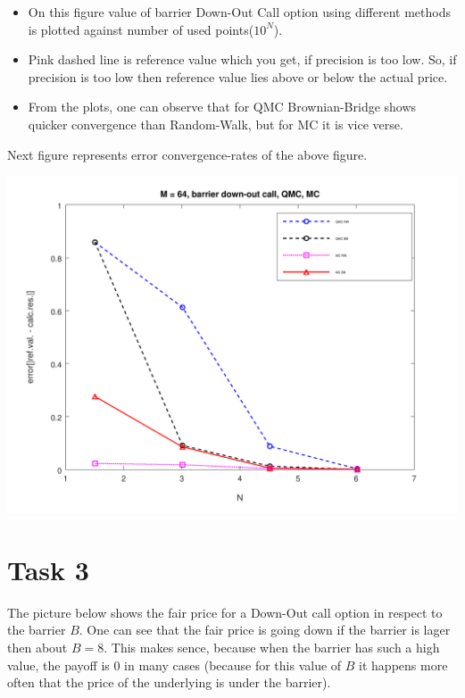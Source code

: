 \documentclass[10pt,a4paper]{article}
\begin{document}
\begin{itemize}
    \item{On this figure value of barrier Down-Out Call option using different methods is plotted against number of used points($10^N$).
    }
\item{
Pink dashed line is reference value which you get, if precision is too low. So, if precision is too low then reference value lies above or below the actual price.
}
\item{
From the plots, one can observe that for QMC Brownian-Bridge shows quicker convergence than Random-Walk, but for MC it is vice verse.
}
\end{itemize}
Next figure represents error convergence-rates of the above figure.

\begin{center}
	\includegraphics[scale=0.35]{images/task2_error.png}
\end{center}

\section*{Task 3}

The picture below shows the fair price for a Down-Out call option in respect to the barrier $B$. One can see that the fair price is going down if the barrier is lager then about $B=8$. This makes sence, because when the barrier has such a high value, the payoff is $0$ in many cases (because for this value of $B$ it happens more often that the price of the underlying is under the barrier).
\end{document}
